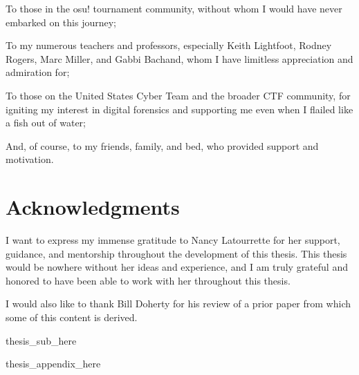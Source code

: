 \documentclass[letterpaper,12pt]{report}
\begin{document}
To those in the osu! tournament community, without whom I would have
never embarked on this journey;

To my numerous teachers and professors, especially Keith Lightfoot,
Rodney Rogers, Marc Miller, and Gabbi Bachand, whom I have limitless
appreciation and admiration for;

To those on the United States Cyber Team and the broader CTF
community, for igniting my interest in digital forensics and supporting
me even when I flailed like a fish out of water;

And, of course, to my friends, family, and bed, who provided support and motivation.


\newpage

\section*{Acknowledgments}

I want to express my immense gratitude to Nancy Latourrette for her
support, guidance, and mentorship throughout the development of this
thesis. This thesis would be nowhere without her ideas and experience,
and I am truly grateful and honored to have been able to work with her
throughout this thesis.

I would also like to thank Bill Doherty for his review of a prior paper 
from which some of this content is derived.


\newpage
\renewcommand*\contentsname{Table of Contents}
\tableofcontents

\newpage
\listoftables

\newpage
\listoffigures

\newpage
\renewcommand{\lstlistlistingname}{List of Code Listings}
\lstlistoflistings

\newpage
{}
\setcounter{page}{1}
\linespread{2}

{{thesis_sub_here}}


\singlespacing
\printbibliography[heading=bibintoc, title={Bibliography}]
% 

\doublespacing
\appendix

\appendix

{{thesis_appendix_here}}
\end{document}
